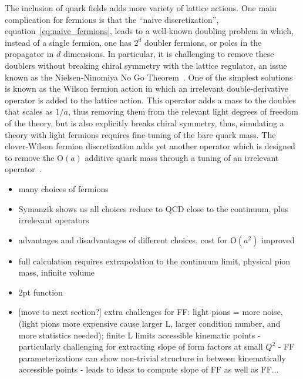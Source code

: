 The inclusion of quark fields adds more variety of lattice actions.
One main complication for fermions is that the ``naive discretization'', equation~\eqref{eq:naive_fermions}, leads to a well-known doubling problem in which, instead of a single fermion, one has $2^d$ doubler fermions, or poles in the propagator in $d$ dimensions.
In particular, it is challenging to remove these doublers without breaking chiral symmetry with the lattice regulator, an issue known as the Nielsen-Ninomiya No Go Theorem~\cite{Nielsen:1981hk,Nielsen:1980rz,Nielsen:1981xu}.
One of the simplest solutions is known as the Wilson fermion action in which an irrelevant double-derivative operator is added to the lattice action.  This operator adds a mass to the doubles that scales as $1/a$, thus removing them from the relevant light degrees of freedom of the theory, but is also explicitly breaks chiral symmetry, thus, simulating a theory with light fermions requires fine-tuning of the bare quark mass.
The clover-Wilson fermion discretization adds yet another operator which is designed to remove the $\mathrm{O}(a)$ additive quark mass through a tuning of an irrelevant operator~.







\begin{itemize}

\item many choices of fermions

\item Symanzik shows us all choices reduce to QCD close to the continuum, plus irrelevant operators

\item advantages and disadvantages of different choices, cost for $\mathrm{O}(a^2)$ improved

\item full calculation requires extrapolation to the continuum limit, physical pion mass, infinite volume

\item 2pt function

\item {\color{red}[move to next section?]} extra challenges for FF: light pions = more noise, (light pions more expensive cause larger L, larger condition number, and more statistics needed); finite L limits accessible kinematic points - particularly challenging for extracting slope of form factors at small $Q^2$ - FF parameterizations can show non-trivial structure in between kinematically accessible points - leads to ideas to compute slope of FF as well as FF...

\end{itemize}
